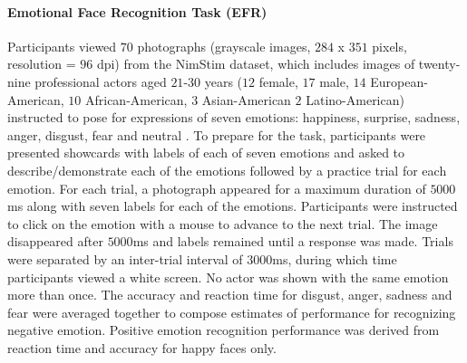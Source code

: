\documentclass[utf8]{frontiersSCNS} %
\begin{document}
\paragraph{Emotional Face Recognition Task (EFR)} Participants viewed $70$ photographs (grayscale images, $284$ x $351$ pixels, resolution = $96$ dpi) from the NimStim dataset, which includes images of twenty-nine professional actors aged $21$-$30$ years ($12$ female, $17$ male, $14$ European-American, $10$ African-American, $3$ Asian-American $2$ Latino-American) instructed to pose for expressions of seven emotions: happiness, surprise, sadness, anger, disgust, fear and neutral \citep{tottenham2009nimstim}. To prepare for the task, participants were presented showcards with labels of each of seven emotions and asked to describe/demonstrate each of the emotions followed by a practice trial for each emotion. For each trial, a photograph appeared for a maximum duration of $5000$ms along with seven labels for each of the emotions. Participants were instructed to click on the emotion with a mouse to advance to the next trial. The image disappeared after $5000$ms and labels remained until a response was made. Trials were separated by an inter-trial interval of $3000$ms, during which time participants viewed a white screen. No actor was shown with the same emotion more than once. The accuracy and reaction time for disgust, anger, sadness and fear were averaged together to compose estimates of performance for recognizing negative emotion. Positive emotion recognition performance was derived from reaction time and accuracy for happy faces only. 
\end{document}
